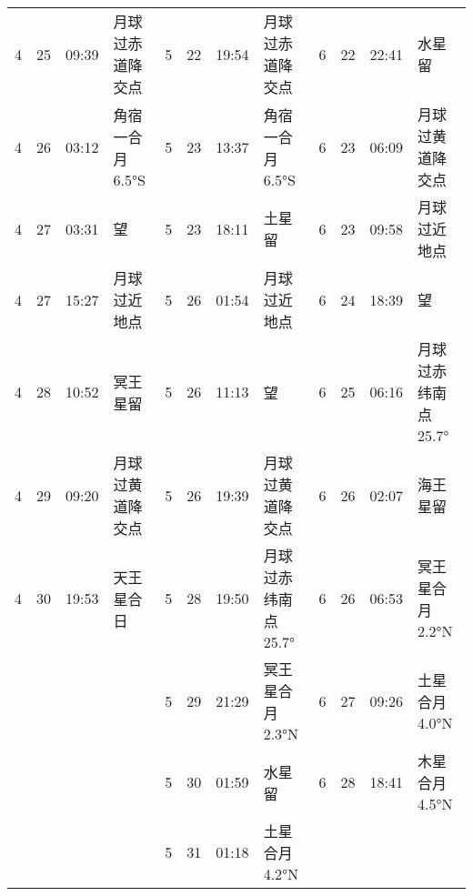 \begin{tabular}{llll|llll|llll}
4 & 25 & 09:39 & 月球过赤道降交点 & 5 & 22 & 19:54 & 月球过赤道降交点 & 6 & 22 & 22:41 & 水星留 \tabularnewline
4 & 26 & 03:12 & 角宿一合月 6.5°S & 5 & 23 & 13:37 & 角宿一合月 6.5°S & 6 & 23 & 06:09 & 月球过黄道降交点 \tabularnewline
4 & 27 & 03:31 & 望 & 5 & 23 & 18:11 & 土星留 & 6 & 23 & 09:58 & 月球过近地点 \tabularnewline
4 & 27 & 15:27 & 月球过近地点 & 5 & 26 & 01:54 & 月球过近地点 & 6 & 24 & 18:39 & 望 \tabularnewline
4 & 28 & 10:52 & 冥王星留 & 5 & 26 & 11:13 & 望 & 6 & 25 & 06:16 & 月球过赤纬南点 25.7° \tabularnewline
4 & 29 & 09:20 & 月球过黄道降交点 & 5 & 26 & 19:39 & 月球过黄道降交点 & 6 & 26 & 02:07 & 海王星留 \tabularnewline
4 & 30 & 19:53 & 天王星合日 & 5 & 28 & 19:50 & 月球过赤纬南点 25.7° & 6 & 26 & 06:53 & 冥王星合月 2.2°N \tabularnewline
 &  &  &  & 5 & 29 & 21:29 & 冥王星合月 2.3°N & 6 & 27 & 09:26 & 土星合月 4.0°N \tabularnewline
 &  &  &  & 5 & 30 & 01:59 & 水星留 & 6 & 28 & 18:41 & 木星合月 4.5°N \tabularnewline
 &  &  &  & 5 & 31 & 01:18 & 土星合月 4.2°N &  &  &  &  \tabularnewline
\hline \end{tabular}

